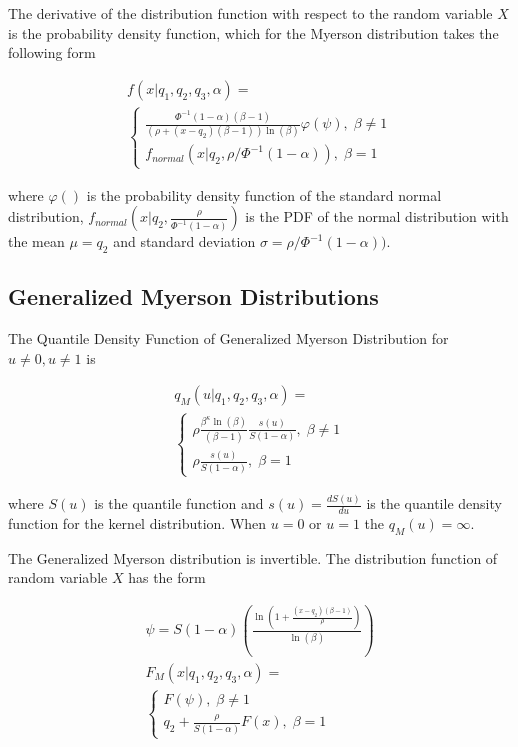 \documentclass[
  letterpaper,
  DIV=11,
  numbers=noendperiod]{scrartcl}
\begin{document}
The derivative of the distribution function with respect to the random
variable \(X\) is the probability density function, which for the
Myerson distribution takes the following form

\[
\begin{gathered}
f(x\vert q_1, q_2, q_3, \alpha)=\\
\begin{cases}
\frac{\Phi^{-1}(1-\alpha)(\beta-1)}{(\rho+(x-q_2)(\beta-1))\ln(\beta)}\varphi(\psi), \; \beta\neq1\\
f_{normal}(x\vert q_2,\rho/\Phi^{-1}(1-\alpha)),\; \beta=1
\end{cases}
\end{gathered}
\]

where \(\varphi()\) is the probability density function of the standard
normal distribution,
\(f_{normal}(x\vert q_2,\frac{\rho}{\Phi^{-1}(1-\alpha)})\) is the PDF
of the normal distribution with the mean \(\mu=q_2\) and standard
deviation \(\sigma=\rho/\Phi^{-1}(1-\alpha))\).

\subsection*{Generalized Myerson
Distributions}\label{generalized-myerson-distributions}

The Quantile Density Function of Generalized Myerson Distribution for
\(u\neq0, u\neq1\) is

\[
\begin{gathered}
q_M(u\vert q_1,q_2,q_3,\alpha)=\\
\begin{cases}
\rho\frac{\beta^\kappa\ln(\beta)}{(\beta-1)}\frac{s(u)}{S(1-\alpha)}, \; \beta \neq 1\\
\rho\frac{s(u)}{S(1-\alpha)}, \; \beta = 1
\end{cases}
\end{gathered}
\]

where \(S(u)\) is the quantile function and \(s(u)=\frac{dS(u)}{du}\) is
the quantile density function for the kernel distribution. When \(u=0\)
or \(u=1\) the \(q_M(u)=\infty\).

The Generalized Myerson distribution is invertible. The distribution
function of random variable \(X\) has the form

\[
\begin{gathered}
\psi =S(1-\alpha)\left(\frac{\ln\left(1+\frac{(x-q_2)(\beta-1)}{\rho}\right)}{\ln(\beta)}\right)\\
F_M(x\vert q_1, q_2, q_3, \alpha) =\\
\begin{cases}
F(\psi), \; \beta\neq 1\\
q_2+ \frac{\rho}{S(1-\alpha)}F(x), \; \beta=1
\end{cases}
\end{gathered}
\]
\end{document}
